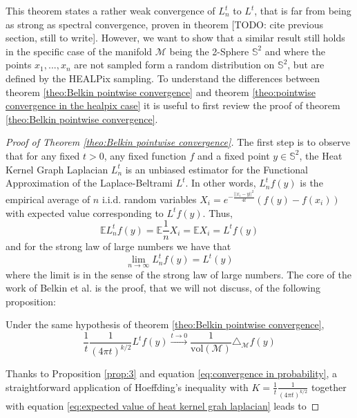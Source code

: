 This theorem states a rather weak convergence of $L_n^t$ to $L^t$, that is far from being as strong as spectral convergence, proven in theorem [TODO: cite previous section, still to write]. However, we want to show that a similar result still holds in the specific case of the manifold $\mathcal M$ being the 2-Sphere $\mathbb S^2$ and where the points $x_1, ..., x_n$ are not sampled form a random distribution on $\mathbb S^2$, but are defined by the HEALPix sampling. To understand the differences between theorem \ref{theo:Belkin pointwise convergence} and theorem \ref{theo:pointwise convergence in the healpix case} it is useful to first review the proof of theorem \ref{theo:Belkin pointwise convergence}.
\begin{proof}[Proof of Theorem \ref{theo:Belkin pointwise convergence}]
The first step is to observe that for any fixed $t>0$, any fixed function $f$ and a fixed point $y\in\mathbb S^2$,  the Heat Kernel Graph Laplacian $L_n^t$ is an unbiased estimator for the Functional Approximation of the Laplace-Beltrami $L^t$. In other words, $L_n^tf(y)$ is the empirical average of $n$ i.i.d. random variables $X_i= e^{-\frac{||x_i-y||^2}{4t}}\left(f(y)-f(x_i)\right)$ with expected value corresponding to $L^tf(y)$. Thus,
\begin{equation}
\label{eq:expected value of heat kernel grah laplacian}
	\mathbb E L_n^tf(y) = 	\mathbb E \frac{1}{n}X_i = \mathbb E X_i = L^tf(y)
\end{equation}
and for the strong law of large numbers we have that
\begin{equation}
\label{eq:convergence in probability}
\lim_{n\to\infty}L_n^tf(y) = L^t(y)
\end{equation}
where the limit is in the sense of the strong law of large numbers.
The core of the work of Belkin et al. is the proof, that we will not discuss, of the following proposition:

\begin{prop} Under the same hypothesis of theorem \ref{theo:Belkin pointwise convergence},
	$$\frac{1}{t}\frac{1}{(4\pi t)^{k/2}} L^tf(y) \xrightarrow{t\to 0 } \frac{1}{\text{vol}(\mathcal M)}\triangle_{\mathcal M}f(y)$$
	\label{prop:3}
\end{prop}

Thanks to Proposition \ref{prop:3} and equation \ref{eq:convergence in probability}, a straightforward application of Hoeffding's inequality with $K=\frac{1}{t}\frac{1}{(4\pi t)^{k/2}}$ together with equation  \ref{eq:expected value of heat kernel grah laplacian} leads to


\end{proof}
